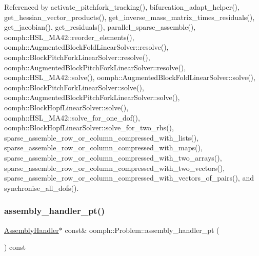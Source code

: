 Referenced by activate\+\_\+pitchfork\+\_\+tracking(), bifurcation\+\_\+adapt\+\_\+helper(), get\+\_\+hessian\+\_\+vector\+\_\+products(), get\+\_\+inverse\+\_\+mass\+\_\+matrix\+\_\+times\+\_\+residuals(), get\+\_\+jacobian(), get\+\_\+residuals(), parallel\+\_\+sparse\+\_\+assemble(), oomph\+::\+H\+S\+L\+\_\+\+M\+A42\+::reorder\+\_\+elements(), oomph\+::\+Augmented\+Block\+Fold\+Linear\+Solver\+::resolve(), oomph\+::\+Block\+Pitch\+Fork\+Linear\+Solver\+::resolve(), oomph\+::\+Augmented\+Block\+Pitch\+Fork\+Linear\+Solver\+::resolve(), oomph\+::\+H\+S\+L\+\_\+\+M\+A42\+::solve(), oomph\+::\+Augmented\+Block\+Fold\+Linear\+Solver\+::solve(), oomph\+::\+Block\+Pitch\+Fork\+Linear\+Solver\+::solve(), oomph\+::\+Augmented\+Block\+Pitch\+Fork\+Linear\+Solver\+::solve(), oomph\+::\+Block\+Hopf\+Linear\+Solver\+::solve(), oomph\+::\+H\+S\+L\+\_\+\+M\+A42\+::solve\+\_\+for\+\_\+one\+\_\+dof(), oomph\+::\+Block\+Hopf\+Linear\+Solver\+::solve\+\_\+for\+\_\+two\+\_\+rhs(), sparse\+\_\+assemble\+\_\+row\+\_\+or\+\_\+column\+\_\+compressed\+\_\+with\+\_\+lists(), sparse\+\_\+assemble\+\_\+row\+\_\+or\+\_\+column\+\_\+compressed\+\_\+with\+\_\+maps(), sparse\+\_\+assemble\+\_\+row\+\_\+or\+\_\+column\+\_\+compressed\+\_\+with\+\_\+two\+\_\+arrays(), sparse\+\_\+assemble\+\_\+row\+\_\+or\+\_\+column\+\_\+compressed\+\_\+with\+\_\+two\+\_\+vectors(), sparse\+\_\+assemble\+\_\+row\+\_\+or\+\_\+column\+\_\+compressed\+\_\+with\+\_\+vectors\+\_\+of\+\_\+pairs(), and synchronise\+\_\+all\+\_\+dofs().

\mbox{\label{classoomph_1_1Problem_a48905dc6c9a8811969407939b3e4ccb6}} 
\subsubsection{\texorpdfstring{assembly\+\_\+handler\+\_\+pt()}{assembly\_handler\_pt()}\hspace{0.1cm}{\footnotesize\ttfamily [2/2]}}
{\footnotesize\ttfamily \hyperlink{classoomph_1_1AssemblyHandler}{Assembly\+Handler}$\ast$ const\& oomph\+::\+Problem\+::assembly\+\_\+handler\+\_\+pt (\begin{DoxyParamCaption}{ }\end{DoxyParamCaption}) const\hspace{0.3cm}{\ttfamily [inline]}}




